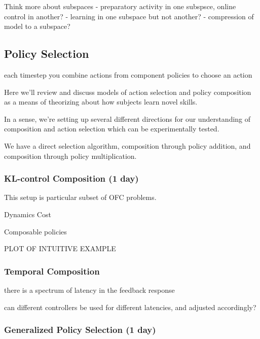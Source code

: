 \documentclass[
  a4paper,
]{article}
\begin{document}
Think more about subspaces - preparatory activity in one subspsce,
online control in another? - learning in one subspace but not another? -
compression of model to a subspace?

\hypertarget{policy-selection}{%
\subsection{Policy Selection}\label{policy-selection}}

each timestep you combine actions from component policies to choose an
action

Here we'll review and discuss models of action selection and policy
composition as a means of theorizing about how subjects learn novel
skills.

In a sense, we're setting up several different directions for our
understanding of composition and action selection which can be
experimentally tested.

We have a direct selection algorithm, composition through policy
addition, and composition through policy multiplication.

\hypertarget{kl-control-composition-1-day}{%
\subsubsection{KL-control Composition (1
day)}\label{kl-control-composition-1-day}}

This setup is particular subset of OFC problems.

Dynamics Cost

Composable policies

PLOT OF INTUITIVE EXAMPLE

\hypertarget{temporal-composition}{%
\subsubsection{Temporal Composition}\label{temporal-composition}}

there is a spectrum of latency in the feedback response

can different controllers be used for different latencies, and adjusted
accordingly?

\hypertarget{generalized-policy-selection-1-day}{%
\subsubsection{Generalized Policy Selection (1
day)}\label{generalized-policy-selection-1-day}}
\end{document}
